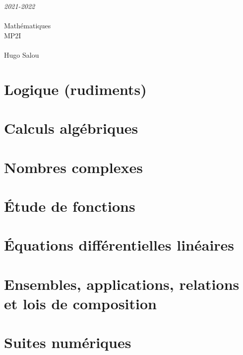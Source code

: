 \documentclass[a4paper]{report}
\newcommand{\chap}[2][0]{
    \setcounter{chapter}{#1 - 1}
    \chapter{#2}
    \renewcommand*\parttitle{#2}
}
\begin{document}
    \begin{titlepage}
        \begin{center}
            \vspace{10cm}
            {\Large \itshape 2021-2022}\\
            \vspace{3cm}
            \\
            \vspace{2mm}
            \vspace{0.5cm}
            {\HUGE Mathématiques}\\
            \vspace{0.5cm}
            {\fontsize{240pt}{260pt}\selectfont MP2I}\\
            \vspace{0.5cm}
            \\
            \vfill
            Hugo {\sc Salou}\\
        \end{center}
    \end{titlepage}
    \tableofcontents


	\chap[00]{Logique (rudiments)}
	\renewcommand{\cwd}{../chap00}
	
	
	
	
	

	\chap[01]{Calculs algébriques}
	\renewcommand{\cwd}{../chap01}
	
	
	

	\chap[02]{Nombres complexes}
	\renewcommand{\cwd}{../chap02}
	
	
	
	
	

	\chap[03]{Étude de fonctions}
	\renewcommand{\cwd}{../chap03}
	

	\chap[06]{Équations différentielles linéaires}
	\renewcommand{\cwd}{../chap06}
	
	
	

	\chap[08]{Ensembles, applications, relations et lois de composition}
	\renewcommand{\cwd}{../chap08}
	
	

	\chap[11]{Suites numériques}
	\renewcommand{\cwd}{../chap11}
	
	
	
	
	
	
	
	
\end{document}
